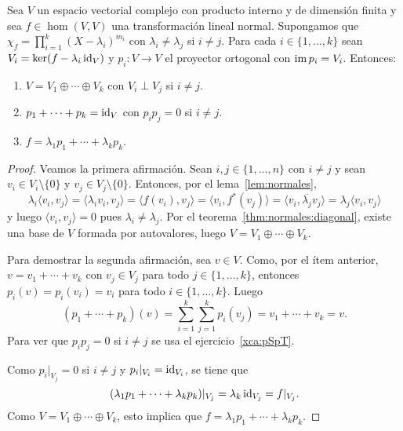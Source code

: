 \begin{thm}
	\label{thm:espectral}
    Sea $V$ un espacio vectorial complejo con producto interno y de dimensión
    finita y sea $f\in\hom(V,V)$ una transformación lineal normal. Supongamos que
    $\chi_f=\prod_{i=1}^k(X-\lambda_i)^{m_i}$ con $\lambda_i\ne\lambda_j$ si
    $i\ne j$. Para cada $i\in\{1,\dots,k\}$ sean $V_i=\ker (f-\lambda_i\operatorname{id}_V)$
    y $p_i\colon V\to V$ el proyector ortogonal con $\operatorname{im} p_i=V_i$. Entonces:
    \begin{enumerate}
        \item $V=V_1\oplus\cdots\oplus V_k$ con $V_i\perp V_j$ si $i\ne j$. 
		\item $p_1+\cdots+p_k=\operatorname{id}_V$ con $p_ip_j=0$ si $i\ne j$.
        \item $f=\lambda_1p_1+\cdots+\lambda_kp_k$.
    \end{enumerate}

    \begin{proof}
		Veamos la primera afirmación. 
		Sean $i,j\in\{1,\dots,n\}$ con $i\ne j$ y sean $v_i\in
		V_i\setminus\{0\}$ y $v_j\in V_j\setminus\{0\}$. Entonces, por el lema~\ref{lem:normales}, 
		\[
			\lambda_i\langle v_i,v_j\rangle
			=\langle \lambda_iv_i,v_j\rangle
			=\langle f(v_i),v_j\rangle
			=\langle v_i,f^*(v_j)\rangle
			=\langle v_i,\overline{\lambda_j}v_j\rangle
			=\lambda_j\langle v_i,v_j\rangle
		\]
		y luego $\langle v_i,v_j\rangle=0$ pues $\lambda_i\ne\lambda_j$. Por el
		teorema~\ref{thm:normales:diagonal}, existe una base de $V$ formada
		por autovalores, luego $V=V_1\oplus\cdots\oplus V_k$. 

		Para demostrar la segunda afirmación, sea $v\in V$. Como, por el ítem
		anterior,  $v=v_1+\cdots+v_k$ con $v_j\in V_j$ para todo
		$j\in\{1,\dots,k\}$, entonces $p_i(v)=p_i(v_i)=v_i$ para todo
		$i\in\{1,\dots,k\}$. Luego
		\[
		(p_1+\cdots+p_k)(v)=\sum_{i=1}^k\sum_{j=1}^k p_i(v_j)=v_1+\cdots+v_k=v.
		\]
		Para ver que $p_ip_j=0$ si $i\ne j$ se usa el ejercicio~\ref{xca:pSpT}.

		Como $p_i|_{V_j}=0$ si $i\ne j$ y $p_i|_{V_i}=\operatorname{id}_{V_i}$, se tiene que 
		\[
		(\lambda_1p_1+\cdots+\lambda_kp_k)|_{V_{j}}=\lambda_k\operatorname{id}_{V_j}=f|_{V_j}.
		\]
		Como $V=V_1\oplus\cdots\oplus V_k$, esto implica que
		$f=\lambda_1p_1+\cdots+\lambda_kp_k$. 
    \end{proof}
\end{thm}


